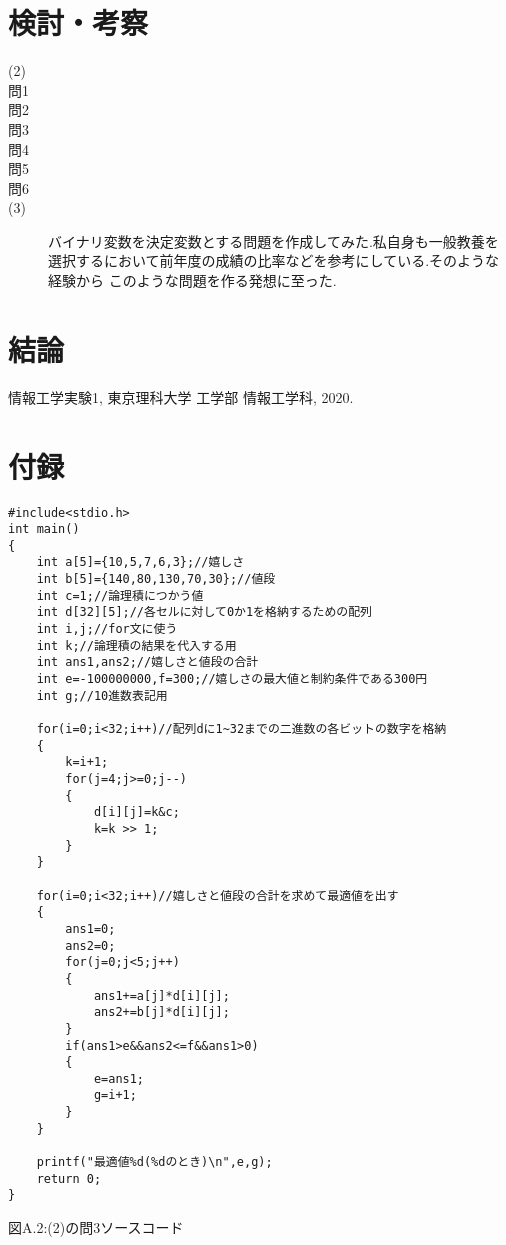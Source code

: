 \documentclass[12pt]{jarticle}
\begin{document}
\section{検討・考察}
\begin{description}
    \item[(2)]
    \item[問1]
    \item[問2]
          
    \item[問3]
          
    \item[問4]
    \item[問5]
    \item[問6]
    \item[(3)]
          バイナリ変数を決定変数とする問題を作成してみた.私自身も一般教養を選択するにおいて前年度の成績の比率などを参考にしている.そのような経験から
          このような問題を作る発想に至った.  
\end{description}
\section{結論}
\begin{thebibliography}{99}
    \label{sannkoubunnkenn_chapter}
    情報工学実験1,
    東京理科大学 工学部 情報工学科, 2020. 
\end{thebibliography}
\clearpage
\appendix
\section{付録}
\begin{framed}
    \begin{verbatim}
#include<stdio.h>
int main()
{
	int a[5]={10,5,7,6,3};//嬉しさ
	int b[5]={140,80,130,70,30};//値段
	int c=1;//論理積につかう値
	int d[32][5];//各セルに対して0か1を格納するための配列
	int i,j;//for文に使う
	int k;//論理積の結果を代入する用
	int ans1,ans2;//嬉しさと値段の合計
	int e=-100000000,f=300;//嬉しさの最大値と制約条件である300円
	int g;//10進数表記用
			
	for(i=0;i<32;i++)//配列dに1~32までの二進数の各ビットの数字を格納
	{
		k=i+1;
		for(j=4;j>=0;j--)
		{
			d[i][j]=k&c;
			k=k >> 1;
		}
	}
			
	for(i=0;i<32;i++)//嬉しさと値段の合計を求めて最適値を出す
	{
		ans1=0;
		ans2=0;
		for(j=0;j<5;j++)
		{
 			ans1+=a[j]*d[i][j];
			ans2+=b[j]*d[i][j];
		}
		if(ans1>e&&ans2<=f&&ans1>0)
		{
			e=ans1;
			g=i+1;
		}
	}
			
	printf("最適値%d(%dのとき)\n",e,g);
	return 0;
}
    \end{verbatim}
\end{framed}
\begin{center}
    図A.2:(2)の問3ソースコード
\end{center}
\end{document}
